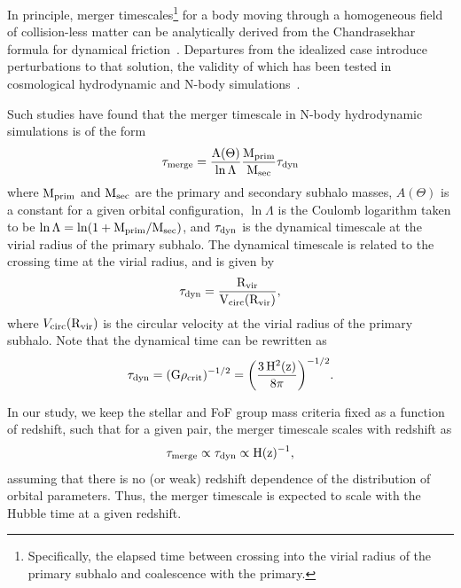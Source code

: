 \documentclass[twocolumn,linenumbers]{aastex631}
\begin{document}
        In principle, merger timescales\footnote{Specifically, the elapsed time between crossing into the virial radius of the primary subhalo and coalescence with the primary.} for a body moving through a homogeneous field of collision-less matter can be analytically derived from the Chandrasekhar formula for dynamical friction~\citep{Binney2008}. 
        Departures from the idealized case introduce perturbations to that solution, the validity of which has been tested in cosmological hydrodynamic and N-body simulations~\citep{Jiang2008, Boylan_kolchin2008}. 

        Such studies have found that the merger timescale in N-body hydrodynamic simulations is of the form
        \begin{equation}
            \rm \tau_{\rm merge} = \frac{A(\Theta)}{\ln \Lambda}\frac{\mprim}{\msec}\tau_{\rm dyn}
        \end{equation}
        where $\rm M_{prim}$ and $\rm M_{sec}$ are the primary and secondary subhalo masses, $A(\Theta)$ is a constant for a given orbital configuration, $\ln\Lambda$ is the Coulomb logarithm taken to be $\ln\Lambda = \ln(1+\rm M_{prim}/\rm M_{sec})$, and $\tau_{\rm dyn}$ is the dynamical timescale at the virial radius of the primary subhalo.
        The dynamical timescale is related to the crossing time at the virial radius, and is given by 
        \begin{equation}
            \rm \tau_{\rm dyn} = \frac{\Rvir}{V_{\rm circ}(\Rvir)},
        \end{equation}
        where $V_{\rm circ}(\rm R_{vir})$ is the circular velocity at the virial radius of the primary subhalo. 
        Note that the dynamical time can be rewritten as 
        \begin{equation}
            \rm \tau_{\rm dyn} = (G\rho_{crit})^{-1/2} = \bigg(\frac{3\,H^2(z)}{8\pi}\bigg)^{-1/2}.
        \end{equation}

        In our study, we keep the stellar and FoF group mass criteria fixed as a function of redshift, such that for a given pair, the merger timescale scales with redshift as
        \begin{equation}
            \rm \tau_{merge} \propto \tau_{dyn} \propto H(z)^{-1},
        \end{equation}
        assuming that there is no (or weak) redshift dependence of the distribution of orbital parameters.
        Thus, the merger timescale is expected to scale with the Hubble time at a given redshift. 
        
\end{document}
